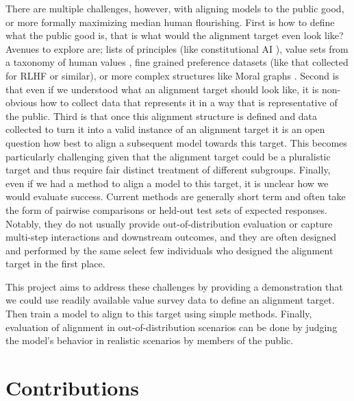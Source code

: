 There are multiple challenges, however, with aligning models to the public good, or more formally maximizing median human flourishing.
First is how to define what the public good is, that is what would the alignment target even look like? Avenues to explore are; lists of principles (like constitutional AI \cite{baiConstitutionalAIHarmlessness2022}), value sets from a taxonomy of human values \cite{schwartzUniversalsContentStructure1992,rokeachNatureHumanValues1973}, fine grained preference datasets (like that collected for RLHF \cite{ouyangTrainingLanguageModels2022} or similar), or more complex structures like Moral graphs \cite{klingefjordWhatAreHuman2024}.
Second is that even if we understood what an alignment target should look like, it is non-obvious how to collect data that represents it in a way that is representative of the public.
Third is that once this alignment structure is defined and data collected to turn it into a valid instance of an alignment target it is an open question how best to align a subsequent model towards this target. This becomes particularly challenging given that the alignment target could be a pluralistic target and thus require fair distinct treatment of different subgroups.
Finally, even if we had a method to align a model to this target, it is unclear how we would evaluate success. Current methods are generally short term and often take the form of pairwise comparisons or held-out test sets of expected responses. Notably, they do not usually provide out-of-distribution evaluation or capture multi-step interactions and downstream outcomes, and they are often designed and performed by the same select few individuals who designed the alignment target in the first place.

This project aims to address these challenges by providing a demonstration that we could use readily available value survey data to define an alignment target. Then train a model to align to this target using simple methods. Finally, evaluation of alignment in out-of-distribution scenarios can be done by judging the model's behavior in realistic scenarios by members of the public.


\section{Contributions}

